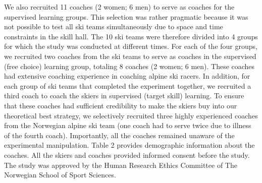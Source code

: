 \documentclass[pdflatex,sn-mathphys-num]{sn-jnl}%
\theoremstyle{thmstyleone}%
\theoremstyle{thmstyletwo}%
\theoremstyle{thmstylethree}%
\begin{document}
We also recruited 11 coaches (2 women; 6 men) to serve as coaches for the supervised learning groups. This selection was rather pragmatic because it was not possible to test all ski teams simultaneously due to space and time constraints in the skill hall. The 10 ski teams were therefore divided into 4 groups for which the study was conducted at different times. For each of the four groups, we recruited two coaches from the ski teams to serve as coaches in the supervised (free choice) learning group, totaling 8 coaches (2 women; 6 men). These coaches had extensive coaching experience in coaching alpine ski racers. In addition, for each group of ski teams that completed the experiment together, we recruited a third coach to coach the skiers in supervised (target skill) learning. To ensure that these coaches had sufficient credibility to make the skiers buy into our theoretical best strategy, we selectively recruited three highly experienced coaches from the Norwegian alpine ski team (one coach had to serve twice due to illness of the fourth coach). Importantly, all the coaches remained unaware of the experimental manipulation. Table 2 provides demographic information about the coaches. All the skiers and coaches provided informed consent before the study. The study was approved by the Human Research Ethics Committee of The Norwegian School of Sport Sciences.
\end{document}
